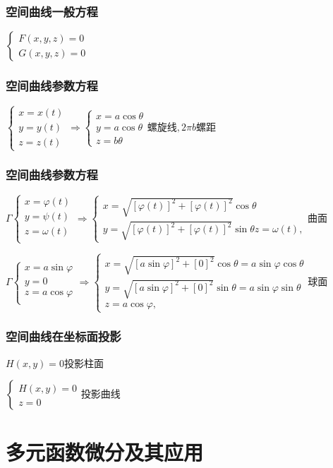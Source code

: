 \documentclass[UTF8]{ctexart}
\newcommand{\mt}[1]{\text{#1}}
\newcommand{\mf}[1]{\left( #1\right)}
\newcommand{\mfc}[1]{\left[ #1 \right]}
\newcommand{\p}{\par}
\newcommand{\ma}[1]{\begin{array}{llll} #1 \end{array}}
\begin{document}
\subsubsection{空间曲线一般方程}

$\left\{\ma{F\mf{x,y,z}=0\\
    G\mf{x,y,z}=0
}\right.$

\subsubsection{空间曲线参数方程}
$\left\{\ma{
    x=x\mf{t}\\
    y=y\mf{t}\\
    z=z\mf{t}
}\right. \Rightarrow \left\{\ma{
    x=a\cos \theta\\
    y=a\cos \theta\\
    z=b \theta
}\right.\mt{螺旋线},2\pi b\mt{螺距}$\p

\subsubsection*{空间曲线参数方程}
$\Gamma \left\{ \ma{
    x=\varphi \mf{t}\\
    y=\psi \mf{t}\\
    z=\omega \mf{t}\\
}\right.\Rightarrow 
 \left\{ \ma{
    x=\sqrt{\mfc{\varphi \mf{t}}^2+\mfc{\varphi \mf{t}}^2}\cos \theta\\
    y=\sqrt{\mfc{\varphi \mf{t}}^2+\mfc{\varphi \mf{t}}^2}\sin \theta
    z=\omega \mf{t},
}\right.\mt{曲面}
$\p
$\Gamma \left\{ \ma{
    x=a\sin \varphi\\
    y=0\\
    z=a\cos \varphi\\
}\right.\Rightarrow 
 \left\{ \ma{
    x=\sqrt{\mfc{a\sin \varphi}^2+\mfc{0}^2}\cos \theta=a\sin \varphi \cos \theta\\
    y=\sqrt{\mfc{a\sin \varphi}^2+\mfc{0}^2}\sin \theta=a\sin \varphi \sin \theta\\
    z=a\cos \varphi,
}\right.\mt{球面}
$
\subsubsection{空间曲线在坐标面投影}
$H\mf{x,y}=0$投影柱面\p
$\left\{ \ma{
    H\mf{x,y}=0\\
    z=0
}\right.$投影曲线

\newpage
\section{多元函数微分及其应用}
\end{document}
